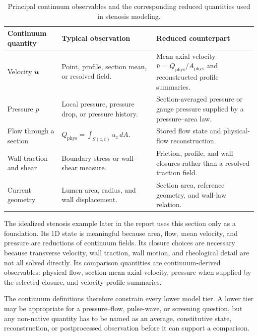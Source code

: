 \begin{table}[!htb]
    \centering
    \small
    \caption{Principal continuum observables and the corresponding reduced
    quantities used in stenosis modeling.}
    \label{tab:continuum-principal-observables}
    \begin{tabularx}{\textwidth}{@{}
        >{\raggedright\arraybackslash}p{}
        >{\raggedright\arraybackslash}p{}
        >{\raggedright\arraybackslash}X
        @{}}
        \toprule
        \textbf{Continuum quantity}
            & \textbf{Typical observation}
            & \textbf{Reduced counterpart} \\
        \midrule
        Velocity $\bm{u}$
            & Point, profile, section mean, or resolved field.
            & Mean axial velocity $\bar u=Q_{\mathrm{phys}}/A_{\mathrm{phys}}$
            and reconstructed profile summaries. \\
        Pressure $p$
            & Local pressure, pressure drop, or pressure history.
            & Section-averaged pressure or gauge pressure supplied by a
            pressure--area law. \\
        Flow through a section
            & $Q_{\mathrm{phys}}=\int_{S(z,t)}u_z\,dA$.
            & Stored flow state and physical-flow reconstruction. \\
        Wall traction and shear
            & Boundary stress or wall-shear measure.
            & Friction, profile, and wall closures rather than a resolved
            traction field. \\
        Current geometry
            & Lumen area, radius, and wall displacement.
            & Section area, reference geometry, and wall-law relation. \\
        \bottomrule
    \end{tabularx}
\end{table}

\begin{stenosisillustration}
The idealized stenosis example later in the report uses this section only as a
foundation. Its 1D state is meaningful because area, flow, mean velocity, and
pressure are reductions of continuum fields. Its closure choices are necessary
because transverse velocity, wall traction, wall motion, and rheological detail
are not all solved directly. Its comparison quantities are continuum-derived
observables: physical flow, section-mean axial velocity, pressure when supplied
by the selected closure, and velocity-profile summaries.
\end{stenosisillustration}

The continuum definitions therefore constrain every lower model tier. A lower
tier may be appropriate for a pressure--flow, pulse-wave, or screening
question, but any non-native quantity has to be named as an average,
constitutive state, reconstruction, or postprocessed observation before it can
support a comparison.
